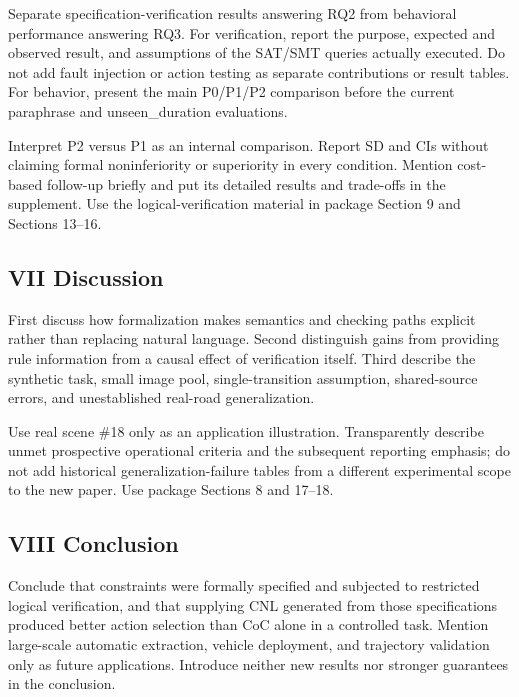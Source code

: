 \documentclass[11pt,a4paper]{article}
\begin{document}
Separate specification-verification results answering RQ2 from behavioral performance answering RQ3. For verification, report the purpose, expected and observed result, and assumptions of the SAT/SMT queries actually executed. Do not add fault injection or action testing as separate contributions or result tables. For behavior, present the main P0/P1/P2 comparison before the current paraphrase and unseen\_\allowbreak{}duration evaluations.\par

Interpret P2 versus P1 as an internal comparison. Report SD and CIs without claiming formal noninferiority or superiority in every condition. Mention cost-based follow-up briefly and put its detailed results and trade-offs in the supplement. Use the logical-verification material in package Section 9 and Sections 13–16.\par

\subsection*{VII Discussion}

First discuss how formalization makes semantics and checking paths explicit rather than replacing natural language. Second distinguish gains from providing rule information from a causal effect of verification itself. Third describe the synthetic task, small image pool, single-transition assumption, shared-source errors, and unestablished real-road generalization.\par

Use real scene \#18 only as an application illustration. Transparently describe unmet prospective operational criteria and the subsequent reporting emphasis; do not add historical generalization-failure tables from a different experimental scope to the new paper. Use package Sections 8 and 17–18.\par

\subsection*{VIII Conclusion}

Conclude that constraints were formally specified and subjected to restricted logical verification, and that supplying CNL generated from those specifications produced better action selection than CoC alone in a controlled task. Mention large-scale automatic extraction, vehicle deployment, and trajectory validation only as future applications. Introduce neither new results nor stronger guarantees in the conclusion.\par
\end{document}
